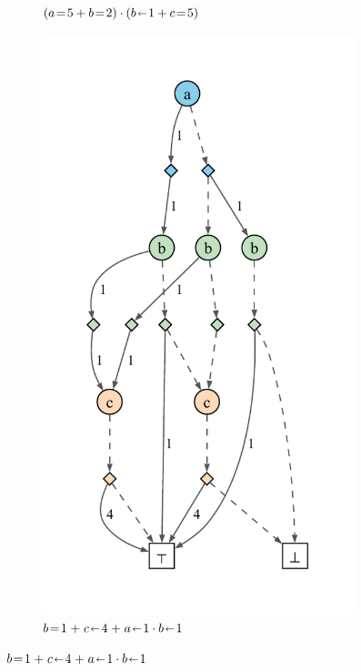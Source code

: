 \documentclass[acmsmall,dvipsnames,nonacm]{acmart}
\begin{document}
\begin{figure}
\begin{subfigure}[b]{0.27\textwidth}
        \caption{$(a \test 5 + b \test 2) \cdot (b \mut 1 + c \test 5)$}
        \label{fig:spp1}
    \end{subfigure}
    \begin{subfigure}[b]{0.33\textwidth}
        \centering
        \includegraphics[scale=0.5]{viz/spp2.pdf}
        \caption{$b \test 1 \mathrel{+} c \mut 4 \mathrel{+} a \mut 1 \cdot b \mut 1$}
        \label{fig:spp2}

\end{subfigure}
\end{figure}
\end{document}
